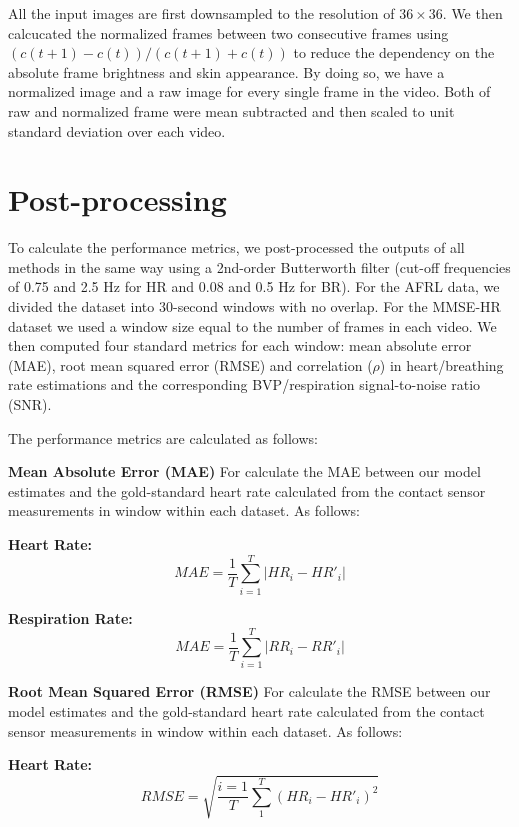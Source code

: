 \documentclass{article}
\begin{document}
All the input images are first downsampled to the resolution of $36\times36$. We then calcucated the normalized frames between two consecutive frames using 
$(c(t+1)-c(t)) / (c(t+1) + c(t))$ to reduce the dependency on the absolute frame brightness and skin appearance. By doing so, we have a normalized image and a raw image for every single frame in the video. Both of raw and normalized frame were mean subtracted and then scaled to unit standard deviation over each video.

\section{Post-processing}

To calculate the performance metrics, we post-processed the outputs of all methods in the same way using a 2nd-order Butterworth filter (cut-off frequencies of 0.75 and 2.5 Hz for HR and 0.08 and 0.5 Hz for BR). For the AFRL data, we divided the dataset into 30-second windows with no overlap. For the MMSE-HR dataset we used a window size equal to the number of frames in each video. We then computed four standard metrics for each window: mean absolute error (MAE), root mean squared error (RMSE) and correlation ($\rho$) in heart/breathing rate estimations and the corresponding BVP/respiration signal-to-noise ratio (SNR). 

The performance metrics are calculated as follows:

\textbf{Mean Absolute Error (MAE)} 
For calculate the MAE between our model estimates and the gold-standard heart rate calculated from the contact sensor measurements in window within each dataset. As follows:

\textbf{Heart Rate:}
\begin{equation}
MAE = \frac{1}{T}\sum_{i=1}^{T} |HR_{i} - HR'_{i}|
\end{equation}

\textbf{Respiration Rate:}
\begin{equation}
MAE = \frac{1}{T}\sum_{i=1}^{T} |RR_{i} - RR'_{i}|
\end{equation}


\textbf{Root Mean Squared Error (RMSE)} 
For calculate the RMSE between our model estimates and the gold-standard heart rate calculated from the contact sensor measurements in window within each dataset. As follows:

\textbf{Heart Rate:}
\begin{equation}
RMSE = \sqrt{\frac{i=1}{T}\sum_{1}^{T} (HR_{i} - HR'_{i})^{2}}
\end{equation}
\end{document}
